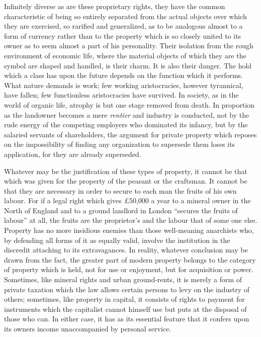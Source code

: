 \documentclass{book}
\begin{document}
Infinitely diverse as are these proprietary rights, they have the common characteristic of being so entirely separated from the actual objects over which they are exercised, so rarified and generalized, as to be analogous almost to a form of currency rather than to the property which is so closely united to its owner as to seem almost a part of his personality. Their isolation from the rough environment of economic life, where the material objects of which they are the symbol are shaped and handled, is their charm. It is also their danger. The hold which a class has upon the future depends on the function which it performs. What nature demands is work; few working aristocracies, however tyrannical, have fallen; few functionless aristocracies have survived. In society, as in the world of organic life, atrophy is but one stage removed from death. In proportion as the landowner becomes a mere \emph{rentier} and industry is conducted, not by the rude energy of the competing employers who dominated its infancy, but by the salaried servants of shareholders, the argument for private property which reposes on the impossibility of finding any organization to supersede them loses its application, for they are already superseded.

Whatever may be the justification of these types of property, it cannot be that which was given for the property of the peasant or the craftsman. It cannot be that they are necessary in order to secure to each man the fruits of his own labour. For if a legal right which gives £50,000 a year to a mineral owner in the North of England and to a ground landlord in London “secures the fruits of labour” at all, the fruits are the proprietor’s and the labour that of some one else. Property has no more insidious enemies than those well-meaning anarchists who, by defending all forms of it as equally valid, involve the institution in the discredit attaching to its extravagances. In reality, whatever conclusion may be drawn from the fact, the greater part of modern property belongs to the category of property which is held, not for use or enjoyment, but for acquisition or power. Sometimes, like mineral rights and urban ground-rents, it is merely a form of private taxation which the law allows certain persons to levy on the industry of others; sometimes, like property in capital, it consists of rights to payment for instruments which the capitalist cannot himself use but puts at the disposal of those who can. In either case, it has as its essential feature that it confers upon its owners income unaccompanied by personal service.
\end{document}

